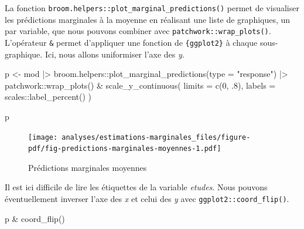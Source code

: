 \documentclass[
  letterpaper,
  DIV=11,
  numbers=noendperiod,
  oneside]{scrreprt}
\newenvironment{Shaded}{\begin{snugshade}}{\end{snugshade}}
\newcommand{\AttributeTok}[1]{\textcolor[rgb]{0.40,0.45,0.13}{#1}}
\newcommand{\DecValTok}[1]{\textcolor[rgb]{0.68,0.00,0.00}{#1}}
\newcommand{\FunctionTok}[1]{\textcolor[rgb]{0.28,0.35,0.67}{#1}}
\newcommand{\NormalTok}[1]{\textcolor[rgb]{0.00,0.23,0.31}{#1}}
\newcommand{\OtherTok}[1]{\textcolor[rgb]{0.00,0.23,0.31}{#1}}
\newcommand{\SpecialCharTok}[1]{\textcolor[rgb]{0.37,0.37,0.37}{#1}}
\newcommand{\StringTok}[1]{\textcolor[rgb]{0.13,0.47,0.30}{#1}}
\begin{document}
La fonction \texttt{broom.helpers::plot\_marginal\_predictions()} permet
de visualiser les prédictions marginales à la moyenne en réalisant une
liste de graphiques, un par variable, que nous pouvons combiner avec
\texttt{patchwork::wrap\_plots()}. L'opérateur \texttt{\&} permet
d'appliquer une fonction de \texttt{\{ggplot2\}} à chaque
sous-graphique. Ici, nous allons uniformiser l'axe des \emph{y}.

\begin{Shaded}
\begin{Highlighting}[]
\NormalTok{p }\OtherTok{\textless{}{-}}\NormalTok{ mod }\SpecialCharTok{|\textgreater{}} 
\NormalTok{  broom.helpers}\SpecialCharTok{::}\FunctionTok{plot\_marginal\_predictions}\NormalTok{(}\AttributeTok{type =} \StringTok{"response"}\NormalTok{) }\SpecialCharTok{|\textgreater{}} 
\NormalTok{  patchwork}\SpecialCharTok{::}\FunctionTok{wrap\_plots}\NormalTok{() }\SpecialCharTok{\&}
  \FunctionTok{scale\_y\_continuous}\NormalTok{(}
    \AttributeTok{limits =} \FunctionTok{c}\NormalTok{(}\DecValTok{0}\NormalTok{, .}\DecValTok{8}\NormalTok{),}
    \AttributeTok{labels =}\NormalTok{ scales}\SpecialCharTok{::}\FunctionTok{label\_percent}\NormalTok{()}
\NormalTok{  )}
\end{Highlighting}
\end{Shaded}

\begin{Shaded}
\begin{Highlighting}[]
\NormalTok{p}
\end{Highlighting}
\end{Shaded}

\begin{figure}[H]

{\centering \texttt{[image: analyses/estimations-marginales\_files/figure-pdf/fig-predictions-marginales-moyennes-1.pdf]}

}

\caption{\label{fig-predictions-marginales-moyennes}Prédictions
marginales moyennes}

\end{figure}

Il est ici difficile de lire les étiquettes de la variable
\emph{etudes}. Nous pouvons éventuellement inverser l'axe des \emph{x}
et celui des \emph{y} avec \texttt{ggplot2::coord\_flip()}.

\begin{Shaded}
\begin{Highlighting}[]
\NormalTok{p }\SpecialCharTok{\&} \FunctionTok{coord\_flip}\NormalTok{()}
\end{Highlighting}
\end{Shaded}
\end{document}
